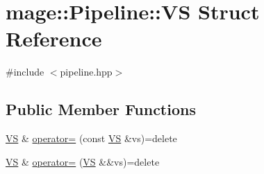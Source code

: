 \hypertarget{structmage_1_1_pipeline_1_1_v_s}{}\section{mage\+:\+:Pipeline\+:\+:VS Struct Reference}
\label{structmage_1_1_pipeline_1_1_v_s}


{\ttfamily \#include $<$pipeline.\+hpp$>$}

\subsection*{Public Member Functions}
\begin{DoxyCompactItemize}
\item 
\hyperlink{structmage_1_1_pipeline_1_1_v_s}{VS} \& \hyperlink{structmage_1_1_pipeline_1_1_v_s_a4cd68d51a425c118036b621cd3b1fe90}{operator=} (const \hyperlink{structmage_1_1_pipeline_1_1_v_s}{VS} \&vs)=delete
\item 
\hyperlink{structmage_1_1_pipeline_1_1_v_s}{VS} \& \hyperlink{structmage_1_1_pipeline_1_1_v_s_a9d941f80b1d1c751927a6c2fda9dfdcb}{operator=} (\hyperlink{structmage_1_1_pipeline_1_1_v_s}{VS} \&\&vs)=delete
\end{DoxyCompactItemize}
